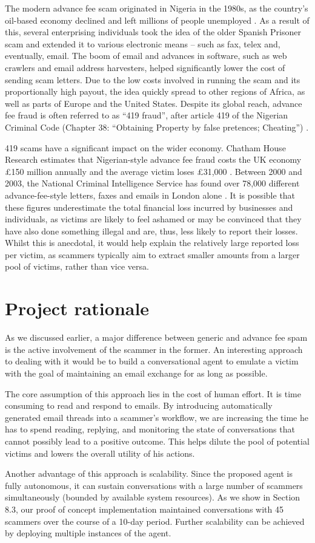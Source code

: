 The modern advance fee scam originated in Nigeria in the 1980s, as the country's oil-based economy declined and left millions of people unemployed \cite{P2}. As a result of this, several enterprising individuals took the idea of the older Spanish Prisoner scam and extended it to various electronic means -- such as fax, telex and, eventually, email. The boom of email and advances in software, such as web crawlers and email address harvesters, helped significantly lower the cost of sending scam letters. Due to the low costs involved in running the scam and its proportionally high payout, the idea quickly spread to other regions of Africa, as well as parts of Europe and the United States. Despite its global reach, advance fee fraud is often referred to as ``419 fraud'', after article 419 of the Nigerian Criminal Code (Chapter 38: ``Obtaining Property by false pretences; Cheating'') \nocite{P3}.

419 scams have a significant impact on the wider economy. Chatham House Research estimates that Nigerian-style advance fee fraud costs the UK economy \pounds150 million annually and the average victim loses \pounds31,000 \cite{P2}. Between 2000 and 2003, the National Criminal Intelligence Service has found over 78,000 different advance-fee-style letters, faxes and emails in London alone \cite{P4}. It is possible that these figures underestimate the total financial loss incurred by businesses and individuals, as victims are likely to feel ashamed or may be convinced that they have also done something illegal and are, thus, less likely to report their losses. Whilst this is anecdotal, it would help explain the relatively large reported loss per victim, as scammers typically aim to extract smaller amounts from a larger pool of victims, rather than vice versa.

\section{Project rationale}
As we discussed earlier, a major difference between generic and advance fee spam is the active involvement of the scammer in the former. An interesting approach to dealing with it would be to build a conversational agent to emulate a victim with the goal of maintaining an email exchange for as long as possible.

The core assumption of this approach lies in the cost of human effort. It is time consuming to read and respond to emails. By introducing automatically generated email threads into a scammer's workflow, we are increasing the time he has to spend reading, replying, and monitoring the state of conversations that cannot possibly lead to a positive outcome. This helps dilute the pool of potential victims and lowers the overall utility of his actions.

Another advantage of this approach is scalability. Since the proposed agent is fully autonomous, it can sustain conversations with a large number of scammers simultaneously (bounded by available system resources). As we show in Section 8.3, our proof of concept implementation maintained conversations with 45 scammers over the course of a 10-day period. Further scalability can be achieved by deploying multiple instances of the agent.